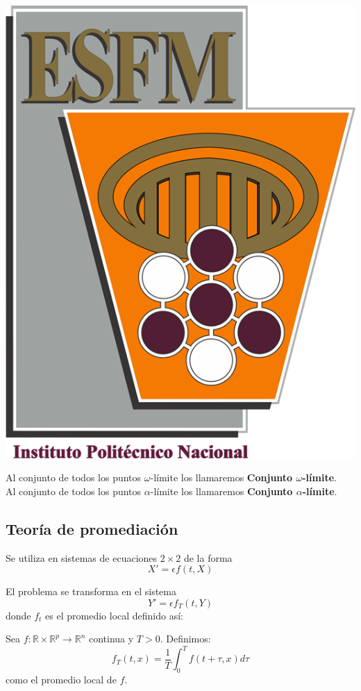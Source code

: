 \documentclass[10pt]{beamer}
\newtheorem{final remarks}{final remarks}[section]
\newtheorem{future work collaboration}{future work collaboration}[section]
\begin{document}
\begin{frame}
\includegraphics[scale=0.3]{Img/esfm4.png}
\titlepage
\end{frame}


\begin{frame}
    Al conjunto de todos los puntos $\omega$-l\'imite los llamaremos \textbf{Conjunto $\omega$-l\'imite}.\\
    Al conjunto de todos los puntos $\alpha$-l\'imite los llamaremos \textbf{Conjunto $\alpha$-l\'imite}.
\end{frame}


\subsection{Teor\'ia de promediaci\'on}

\begin{frame}
    Se utiliza en sistemas de ecuaciones $2\times 2$ de la forma
    $$X'=\epsilon f(t,X)$$

    El problema se transforma en el sistema 
    $$Y'=\epsilon f_T(t,Y)$$
    donde $f_t$ es el promedio local definido así:
    \begin{definition}
        Sea $f:\mathbb{R}\times\mathbb{R}^p\to\mathbb{R}^n$ continua y $T>0$.
        Definimos:
        $$
            f_T(t,x)=\frac{1}{T}\int_{0}^{T}f(t+\tau,x)d\tau
        $$
        como el promedio local de $f$.
    \end{definition}
\end{frame}
\end{document}
